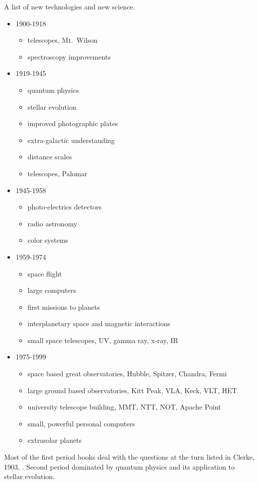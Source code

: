A list of new technologies and new science.
\begin{itemize}
\item 1900-1918
  \begin{itemize}
  \item telescopes, Mt.\ Wilson
  \item spectroscopy improvements
  \end{itemize}
\item 1919-1945
  \begin{itemize}
  \item quantum physics
  \item stellar evolution
  \item improved photographic plates
  \item extra-galactic understanding
  \item distance scales
  \item telescopes, Palomar
  \end{itemize}
\item 1945-1958
  \begin{itemize}
  \item photo-electrics detectors
  \item radio astronomy
  \item color systems
  \end{itemize}
\item 1959-1974
  \begin{itemize}
  \item space flight
  \item large computers
  \item first missions to planets
  \item interplanetary space and magnetic interactions
  \item small space telescopes, UV, gamma ray, x-ray, IR
  \end{itemize}
\item 1975-1999
  \begin{itemize}
  \item space based great observatories, Hubble, Spitzer, Chandra, Fermi
  \item large ground based observatories, Kitt Peak, VLA, Keck, VLT, HET
  \item university telescope building, MMT, NTT, NOT, Apache Point
  \item small, powerful personal computers
  \item extrasolar planets
  \end{itemize}
\end{itemize}

Most of the first period books deal with the questions at the turn
listed in Clerke, 1903, \cite{clerke:1903}.  Second period dominated
by quantum physics and its application to stellar evolution.
